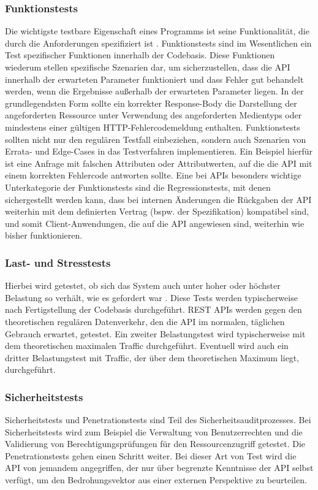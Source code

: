 \subsubsection{Funktionstests}
Die wichtigste testbare Eigenschaft eines Programms ist seine Funktionalität, die durch die Anforderungen spezifiziert ist \parencite[457]{ludewig2007software}. Funktionstests sind im Wesentlichen ein Test spezifischer Funktionen innerhalb der Codebasis. Diese Funktionen wiederum stellen spezifische Szenarien dar, um sicherzustellen, dass die API innerhalb der erwarteten Parameter funktioniert und dass Fehler gut behandelt werden, wenn die Ergebnisse außerhalb der erwarteten Parameter liegen. In der grundlegendsten Form sollte ein korrekter Response-Body die Darstellung der angeforderten Ressource unter Verwendung des angeforderten Medientyps oder mindestens einer gültigen HTTP-Fehlercodemeldung enthalten. Funktionstests sollten nicht nur den regulären Testfall einbeziehen, sondern auch Szenarien von Errata- und Edge-Cases in das Testverfahren implementieren. Ein Beispiel hierfür ist eine Anfrage mit falschen Attributen oder Attributwerten, auf die die API mit einem korrekten Fehlercode antworten sollte. Eine bei APIs besonders wichtige Unterkategorie der Funktionstests sind die Regressionstests, mit denen sichergestellt werden kann, dass bei internen Änderungen die Rückgaben der API weiterhin mit dem definierten Vertrag (bspw. der Spezifikation) kompatibel sind, und somit Client-Anwendungen, die auf die API angewiesen sind, weiterhin wie bisher funktionieren.

\subsubsection{Last- und Stresstests}
Hierbei wird getestet, ob sich das System auch unter hoher oder höchster Belastung so verhält, wie es gefordert war \parencite[458]{ludewig2007software}. Diese Tests werden typischerweise nach Fertigstellung der Codebasis durchgeführt. REST APIs werden gegen den theoretischen regulären Datenverkehr, den die API im normalen, täglichen Gebrauch erwartet, getestet. Ein zweiter Belastungstest wird typischerweise mit dem theoretischen maximalen Traffic durchgeführt. Eventuell wird auch ein dritter Belastungstest mit Traffic, der über dem theoretischen Maximum liegt, durchgeführt.

\subsubsection{Sicherheitstests}
Sicherheitstests und Penetrationstests sind Teil des Sicherheitsauditprozesses. Bei Sicherheitstests wird zum Beispiel die Verwaltung von Benutzerrechten und die Validierung von Berechtigungsprüfungen für den Ressourcenzugriff getestet. Die Penetrationstests gehen einen Schritt weiter. Bei dieser Art von Test wird die API von jemandem angegriffen, der nur über begrenzte Kenntnisse der API selbst verfügt, um den Bedrohungsvektor aus einer externen Perspektive zu beurteilen.

